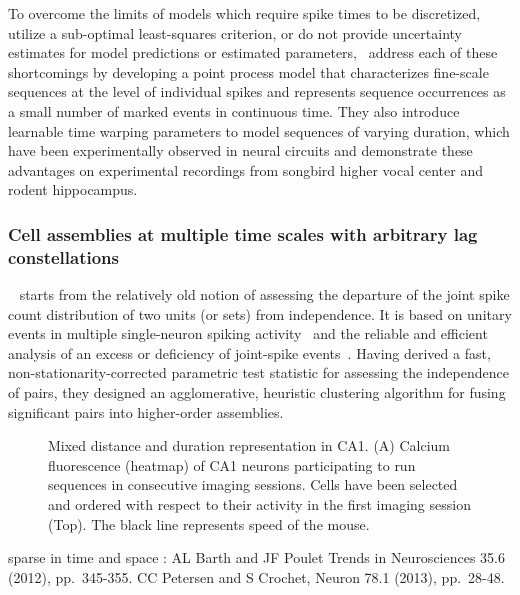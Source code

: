 \documentclass[brainsci, %
               review,submit,pdftex,moreauthors%
               ]{Definitions/mdpi}
\begin{document}
To overcome the limits of models which require spike times to be discretized, utilize a sub-optimal least-squares criterion, or do not provide uncertainty estimates for model predictions or estimated parameters,~\citep{williams_point_2020} address each of these shortcomings by developing a point process model that characterizes fine-scale sequences at the level of individual spikes and represents sequence occurrences as a small number of marked events in continuous time. They also introduce learnable time warping parameters to model sequences of varying duration, which have been experimentally observed in neural circuits and demonstrate these advantages on experimental recordings from songbird higher vocal center and rodent hippocampus.


\subsubsection{Cell assemblies at multiple time scales with arbitrary lag constellations}\label{cell-assemblies-at-multiple-time-scales-with-arbitrary-lag-constellations}
~\citep{russo_cell_2017} starts from the relatively old notion of assessing the departure of the joint spike count distribution of two units (or sets) from independence. It is based on unitary events in multiple single-neuron spiking activity~\citep{grun_unitary_2002-1} and the reliable and efficient analysis of an excess or deficiency of joint-spike events~\citep{pipa_neuroxidence_2008}. Having derived a fast, non-stationarity-corrected parametric test statistic for assessing the independence of pairs, they designed an agglomerative, heuristic clustering algorithm for fusing significant pairs into higher-order assemblies.



\begin{figure}
\centering
\caption{Mixed distance and duration representation in CA1. (A) Calcium fluorescence (heatmap) of CA1 neurons participating to run sequences in consecutive imaging sessions. Cells have been selected and ordered with respect to their activity in the first imaging session (Top). The black line represents speed of the mouse.}\label{fig:haimerl}
\end{figure}


sparse in time and space : AL Barth and JF Poulet Trends in Neurosciences 35.6 (2012), pp.~345-355. 
CC Petersen and S Crochet, Neuron 78.1 (2013), pp.~28-48.
\end{document}
